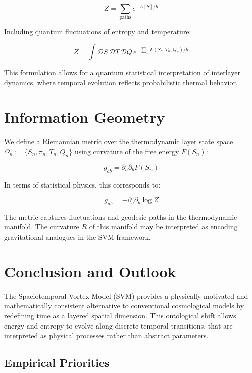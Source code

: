 \documentclass[11pt]{article}
\begin{document}
\begin{equation*}
Z = \sum_{\text{paths}} e^{-A[S]/\hbar}
\end{equation*}

Including quantum fluctuations of entropy and temperature:

\begin{equation*}
Z = \int \mathcal{D}S\, \mathcal{D}T\, \mathcal{D}Q\, e^{- \sum_n L(S_n, T_n, Q_n)/\hbar}
\end{equation*}

This formulation allows for a quantum statistical interpretation of interlayer dynamics, where temporal evolution reflects probabilistic thermal behavior.

\section{Information Geometry}

We define a Riemannian metric over the thermodynamic layer state space $\Omega_n := \{S_n, \pi_n, T_n, Q_n\}$ using curvature of the free energy $F(S_n)$:

\begin{equation*}
g_{ab} = \partial_a \partial_b F(S_n)
\end{equation*}

In terms of statistical physics, this corresponds to:

\begin{equation*}
g_{ab} = -\partial_a \partial_b \log Z
\end{equation*}

The metric captures fluctuations and geodesic paths in the thermodynamic manifold. The curvature $R$ of this manifold may be interpreted as encoding gravitational analogues in the SVM framework.

\printglossaries

\section{Conclusion and Outlook}

The Spaciotemporal Vortex Model (SVM) provides a physically motivated and mathematically consistent alternative to conventional cosmological models by redefining time as a layered spatial dimension. This ontological shift allows energy and entropy to evolve along discrete temporal transitions, that are interpreted as physical processes rather than abstract parameters.

\subsection*{Empirical Priorities}
\end{document}
